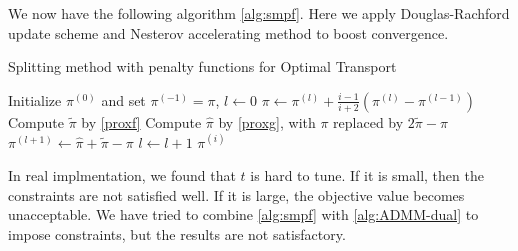 \documentclass[english]{pkupaper}
\begin{document}
\begin{appendix}
We now have the following algorithm \ref{alg:smpf}. Here we apply Douglas-Rachford update scheme and Nesterov accelerating method to boost convergence.

\begin{algorithm}
\caption{Splitting method with penalty functions for Optimal Transport}
\label{alg:smpf}
\begin{algorithmic}[1]
\STATE Initialize $\pi^{(0)}$ and set $\pi^{(-1)} = \pi$, $l\gets 0$
	\STATE $\pi \gets \pi^{(l)}+\frac{i-1}{i+2}(\pi^{(l)}-\pi^{(l-1)})$
	\STATE Compute $\tilde\pi$ by \ref{proxf}
	\STATE Compute $\hat\pi$ by \ref{proxg}, with $\pi$ replaced by $2\tilde\pi-\pi$
	\STATE $\pi^{(l+1)} \gets \hat\pi+\tilde\pi-\pi$
	\STATE $l\gets l + 1$
\ENDWHILE
\RETURN $\pi^{(i)}$
\end{algorithmic}
\end{algorithm}

In real implmentation, we found that $t$ is hard to tune. If it is small, then the constraints are not satisfied well. If it is large, the objective value becomes unacceptable. We have tried to combine \ref{alg:smpf} with \ref{alg:ADMM-dual} to impose constraints, but the results are not satisfactory.
\end{appendix}
\end{document}
